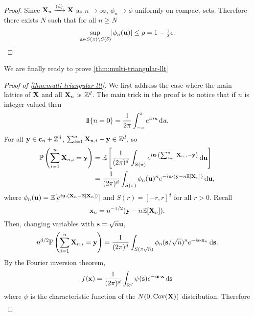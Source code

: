 \begin{proof}
    Since ${\mathbf X}_n \xrightarrow[]{\mathrm{(d)}} {\mathbf X}$ as $n \to \infty$, $\phi_n \to \phi$ uniformly on compact sets. Therefore there exists $N$ such that for all $n \geq N$
    \begin{equation*}
        \sup_{{\mathbf u} \in S(\pi) \setminus S(\delta)} \lvert\phi_n({\mathbf u})\rvert \leq \rho = 1 - \tfrac{1}{2} \epsilon. \qedhere
    \end{equation*}
\end{proof}

We are finally ready to prove \cref{thm:multi-triangular-llt}

\begin{proof}[Proof of \cref{thm:multi-triangular-llt}]
    We first address the case where the main lattice of ${\mathbf X}$ and all ${\mathbf X}_n$ is ${\mathbb Z}^d$. The main trick in the proof is to notice that if $n$ is integer valued then
    \begin{equation*}
        \one\{n = 0\} = \frac{1}{2\pi} \int_{-\pi}^{\pi} e^{i n u} \dif u.
    \end{equation*}
    For all ${\mathbf y} \in {\mathbf c}_n + {\mathbb Z}^d$, $\sum_{i=1}^n {\mathbf X}_{n, i} - {\mathbf y} \in {\mathbb Z}^d$, so 
    \begin{align*}
        {\mathbb P}\left( \sum_{i=1}^n {\mathbf X}_{n, i} = {\mathbf y} \right)
        &= {\mathbb E}\left[ 
            \frac{1}{(2 \pi)^d} \int_{S(\pi)} e^{i {\mathbf u} \cdot \left(\sum_{i=1}^n {\mathbf X}_{n, i} - {\mathbf y}\right)} \mathop{}\!\mathrm{d} {\mathbf u}
         \right] \\
        &= \frac{1}{(2 \pi)^d} \int_{S(\pi)} \phi_n({\mathbf u})^n e^{-i {\mathbf u} \cdot ({\mathbf y} - n {\mathbb E}[{\mathbf X}_n])} \mathop{}\!\mathrm{d} {\mathbf u},
    \end{align*}
    where $\phi_n({\mathbf u}) = {\mathbb E}[e^{i {\mathbf u} \cdot ({\mathbf X}_n - {\mathbb E}[{\mathbf X}_n])}]$ and $S(r) = [-r, r]^d$ for all $r > 0$. Recall
    \begin{equation*}
        {\mathbf x}_n = n^{-1/2}({\mathbf y} - n {\mathbb E}[{\mathbf X}_n]).
    \end{equation*}
    Then, changing variables with ${\mathbf s} = \sqrt{n} {\mathbf u}$,
    \begin{equation*}
        n^{d/2} {\mathbb P}\left( \sum_{i=1}^n {\mathbf X}_{n, i} = {\mathbf y} \right)
        = \frac{1}{(2 \pi)^d} \int_{S(\pi\sqrt{n})} \phi_n({\mathbf s}/\sqrt{n})^n e^{-i {\mathbf s} \cdot {\mathbf x}_n} \mathop{}\!\mathrm{d} {\mathbf s}.
    \end{equation*}
    By the Fourier inversion theorem,
    \begin{equation*}
        f({\mathbf x}) = \frac{1}{(2 \pi)^d} \int_{{\mathbb R}^d} \psi({\mathbf s}) e^{-i {\mathbf s} \cdot {\mathbf x}} \mathop{}\!\mathrm{d} {\mathbf s}
    \end{equation*}
    where $\psi$ is the characteristic function of the $N(0, \operatorname{Cov}({\mathbf X}))$ distribution. Therefore
    \begin{align*}

\end{align*}
\end{proof}

